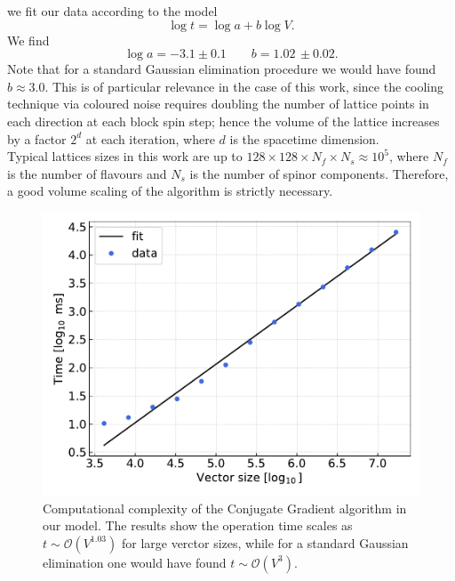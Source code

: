 we fit our data according to the model 
\begin{equation*}
    \log t = \log a + b \log V.
\end{equation*}
We find 
\begin{equation*}
    \log a = -3.1 \pm 0.1 \qquad b = 1.02 \, \pm 0.02.
\end{equation*}
Note that for a standard Gaussian elimination procedure we would have found $b \approx 3.0$. This is of particular relevance in the case of this work, since the cooling technique via coloured noise requires doubling the number of lattice points in each direction at each block spin step; hence the volume of the lattice increases by a factor $2^d$ at each iteration, where $d$ is the spacetime dimension. \\
Typical lattices sizes in this work are up to $128 \times 128 \times N_f \times N_s \approx 10^5$, where $N_f$ is the number of flavours and $N_s$ is the number of spinor components. Therefore, a good volume scaling of the algorithm is strictly necessary.
\begin{figure}[t]
    \centering
    \includegraphics[scale=0.65]{figures/complexity.pdf}
    \caption[Computational complexity of the Conjugate Gradient algorithm.]{Computational complexity of the Conjugate Gradient algorithm in our model. The results show the operation time scales as $t \sim \mathcal{O}(V^{1.03})$ for large verctor sizes, while for a standard Gaussian elimination one would have found $t \sim \mathcal{O}(V^3)$.}
    \label{fig:complexity}
\end{figure}

